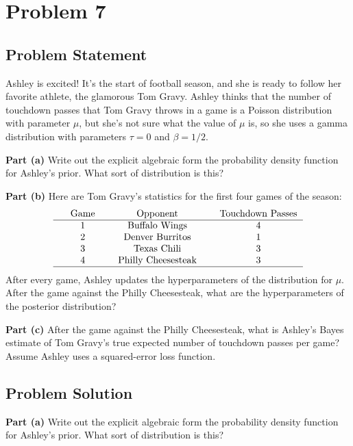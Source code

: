 \documentclass[12pt]{article}
\theoremstyle{definition}
\begin{document}
\newpage
\section*{Problem 7}

\subsection*{Problem Statement}

Ashley is excited! It's the start of football season, and she is ready to follow her favorite athlete, the glamorous Tom Gravy. Ashley thinks that the number of touchdown passes that Tom Gravy throws in a game is a Poisson distribution with parameter $\mu$, but she's not sure what the value of $\mu$ is, so she uses a gamma distribution with parameters $\tau = 0$ and $\beta = 1/2$.

\bigskip
\noindent
{\bf Part (a)} Write out the explicit algebraic form the probability density function for Ashley's prior. What sort of distribution is this?

\bigskip
\noindent
{\bf Part (b)} Here are Tom Gravy's statistics for the first four games of the season:
$$
\begin{tabular}{ccccccc}
& Game & & Opponent & & Touchdown Passes\\
\hline
& 1 & & Buffalo Wings & & 4\\
& 2 & & Denver Burritos & & 1\\
& 3 & & Texas Chili & & 3\\
& 4 & & Philly Cheesesteak & & 3\\
\hline
\end{tabular}
$$
After every game, Ashley updates the hyperparameters of the distribution for $\mu$. After the game against the Philly Cheesesteak, what are the hyperparameters of the posterior distribution?

\bigskip
\noindent
{\bf Part (c)} After the game against the Philly Cheesesteak, what is Ashley's Bayes estimate of Tom Gravy's true expected number of touchdown passes per game? Assume Ashley uses a squared-error loss function.

\newpage
\subsection*{Problem Solution}

\noindent
{\bf Part (a)} Write out the explicit algebraic form the probability density function for Ashley's prior. What sort of distribution is this?
\end{document}
